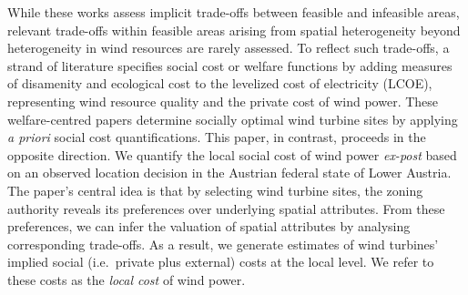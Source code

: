 \documentclass[review, a4paper, 12pt, authoryear, times]{elsarticle}
\begin{document}
While these works assess implicit trade-offs between feasible and infeasible areas, relevant trade-offs within feasible areas arising from spatial heterogeneity beyond heterogeneity in wind resources are rarely assessed.
To reflect such trade-offs, a strand of literature specifies social cost or welfare functions by adding measures of disamenity \citep{Ruhnau2022, Lehmann2023} and ecological cost \citep{Drechsler2011, Grimsrud2021} to the levelized cost of electricity (LCOE), representing wind resource quality and the private cost of wind power.
These welfare-centred papers determine socially optimal wind turbine sites by applying \emph{a priori} social cost quantifications. 
This paper, in contrast, proceeds in the opposite direction.
We quantify the local social cost of wind power \emph{ex-post} based on an observed location decision in the Austrian federal state of Lower Austria.
The paper's central idea is that by selecting wind turbine sites, the zoning authority reveals its preferences over underlying spatial attributes.
From these preferences, we can infer the valuation of spatial attributes by analysing corresponding trade-offs.
As a result, we generate estimates of wind turbines' implied social (i.e.\ private plus external) costs at the local level.
We refer to these costs as the \emph{local cost} of wind power.
\end{document}
